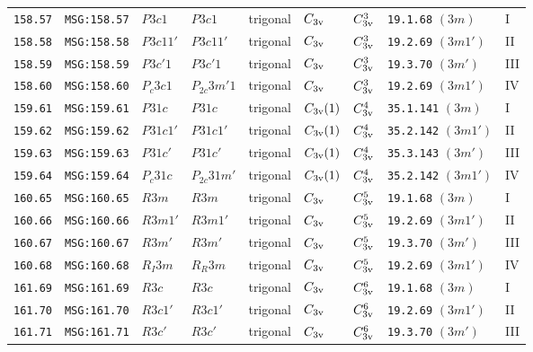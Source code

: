 \documentclass[fleqn,10pt]{jsarticle}
\begin{document}
\begin{center}
\begin{longtable}{lllllllll}
\texttt{158.57} & \texttt{MSG:158.57} & $P3c1$ & $P3c1$ & trigonal & $C_{\rm 3v}$ & $C_{\rm 3v}^{3}$ & \texttt{19.1.68} $(3m)$ & I \\
\texttt{158.58} & \texttt{MSG:158.58} & $P3c11'$ & $P3c11'$ & trigonal & $C_{\rm 3v}$ & $C_{\rm 3v}^{3}$ & \texttt{19.2.69} $(3m1')$ & II \\
\texttt{158.59} & \texttt{MSG:158.59} & $P3c'1$ & $P3c'1$ & trigonal & $C_{\rm 3v}$ & $C_{\rm 3v}^{3}$ & \texttt{19.3.70} $(3m')$ & III \\
\texttt{158.60} & \texttt{MSG:158.60} & $P_{c}3c1$ & $P_{2c}3m'1$ & trigonal & $C_{\rm 3v}$ & $C_{\rm 3v}^{3}$ & \texttt{19.2.69} $(3m1')$ & IV \\ \hline
\texttt{159.61} & \texttt{MSG:159.61} & $P31c$ & $P31c$ & trigonal & $C_{\rm 3v}(1)$ & $C_{\rm 3v}^{4}$ & \texttt{35.1.141} $(3m)$ & I \\
\texttt{159.62} & \texttt{MSG:159.62} & $P31c1'$ & $P31c1'$ & trigonal & $C_{\rm 3v}(1)$ & $C_{\rm 3v}^{4}$ & \texttt{35.2.142} $(3m1')$ & II \\
\texttt{159.63} & \texttt{MSG:159.63} & $P31c'$ & $P31c'$ & trigonal & $C_{\rm 3v}(1)$ & $C_{\rm 3v}^{4}$ & \texttt{35.3.143} $(3m')$ & III \\
\texttt{159.64} & \texttt{MSG:159.64} & $P_{c}31c$ & $P_{2c}31m'$ & trigonal & $C_{\rm 3v}(1)$ & $C_{\rm 3v}^{4}$ & \texttt{35.2.142} $(3m1')$ & IV \\ \hline
\texttt{160.65} & \texttt{MSG:160.65} & $R3m$ & $R3m$ & trigonal & $C_{\rm 3v}$ & $C_{\rm 3v}^{5}$ & \texttt{19.1.68} $(3m)$ & I \\
\texttt{160.66} & \texttt{MSG:160.66} & $R3m1'$ & $R3m1'$ & trigonal & $C_{\rm 3v}$ & $C_{\rm 3v}^{5}$ & \texttt{19.2.69} $(3m1')$ & II \\
\texttt{160.67} & \texttt{MSG:160.67} & $R3m'$ & $R3m'$ & trigonal & $C_{\rm 3v}$ & $C_{\rm 3v}^{5}$ & \texttt{19.3.70} $(3m')$ & III \\
\texttt{160.68} & \texttt{MSG:160.68} & $R_{I}3m$ & $R_{R}3m$ & trigonal & $C_{\rm 3v}$ & $C_{\rm 3v}^{5}$ & \texttt{19.2.69} $(3m1')$ & IV \\ \hline
\texttt{161.69} & \texttt{MSG:161.69} & $R3c$ & $R3c$ & trigonal & $C_{\rm 3v}$ & $C_{\rm 3v}^{6}$ & \texttt{19.1.68} $(3m)$ & I \\
\texttt{161.70} & \texttt{MSG:161.70} & $R3c1'$ & $R3c1'$ & trigonal & $C_{\rm 3v}$ & $C_{\rm 3v}^{6}$ & \texttt{19.2.69} $(3m1')$ & II \\
\texttt{161.71} & \texttt{MSG:161.71} & $R3c'$ & $R3c'$ & trigonal & $C_{\rm 3v}$ & $C_{\rm 3v}^{6}$ & \texttt{19.3.70} $(3m')$ & III \\

\end{longtable}
\end{center}
\end{document}
